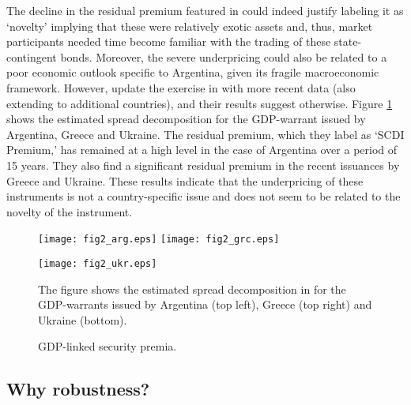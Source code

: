 The decline in the residual premium featured in \citet*{ChamonCostaRicci2008} could indeed justify labeling it as `novelty' implying that these were relatively exotic assets and, thus, market participants needed time become familiar with the trading of these state-contingent bonds. Moreover, the severe underpricing could also be related to a poor economic outlook specific to Argentina, given its fragile macroeconomic framework. However, \cite{Taehoon} update the exercise in \citet*{ChamonCostaRicci2008} with more recent data (also extending to additional countries), and their results suggest otherwise. Figure \ref{Figures_Taehoon} shows the estimated spread decomposition for the GDP-warrant issued by Argentina, Greece and Ukraine. The residual premium, which they label as `SCDI Premium,' has remained at a high level in the case of Argentina over a period of 15 years. They also find a significant residual premium in the recent issuances by Greece and Ukraine. These results indicate that the underpricing of these instruments is not a country-specific issue and does not seem to be related to the novelty of the instrument.

\begin{figure}[!hbtp]
	\texttt{[image: fig2\_arg.eps]}
	\texttt{[image: fig2\_grc.eps]}
	\begin{center}
		\texttt{[image: fig2\_ukr.eps]}
	\end{center}
	\caption{GDP-linked security premia. \label{Figures_Taehoon}}
	\begin{figurenotes}
	The figure shows the estimated spread decomposition in \cite{Taehoon} for the GDP-warrants issued by Argentina (top left), Greece (top right) and Ukraine (bottom). 
	\end{figurenotes}
\end{figure}

\subsection{Why robustness? \label{subsec:summarySCI_2}}

